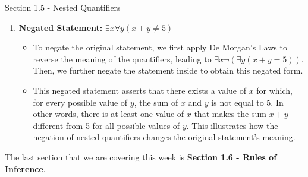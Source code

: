 \begin{notes}{Section 1.5 - Nested Quantifiers}
\begin{highlight}
\begin{enumerate}
            \item \textbf{Negated Statement:} \(\exists x \forall y (x + y \neq 5)\)
            \begin{itemize}
                \item To negate the original statement, we first apply De Morgan's Laws to reverse the meaning of the quantifiers, leading to \(\exists x \neg(\exists y (x + y = 5))\). Then, we further negate the statement inside to obtain this negated form.
                \item This negated statement asserts that there exists a value of \(x\) for which, for every possible value of \(y\), the sum of \(x\) and \(y\) is not equal to 5. In other words, there is at least one value of \(x\) that makes the sum \(x + y\) different from 5 
                for all possible values of \(y\). This illustrates how the negation of nested quantifiers changes the original statement's meaning.
            \end{itemize}
        \end{enumerate}
    \end{highlight}
\end{notes}

The last section that we are covering this week is \textbf{Section 1.6 - Rules of Inference}.


